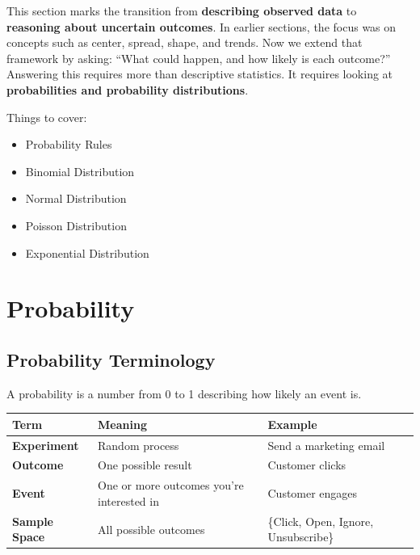 \documentclass[
  letterpaper,
  DIV=11,
  numbers=noendperiod]{scrreprt}
\newcounter{none} %
\providecommand{\tightlist}{%
  \setlength{\itemsep}{0pt}\setlength{\parskip}{0pt}}
\begin{document}
This section marks the transition from \textbf{describing observed data}
to \textbf{reasoning about uncertain outcomes}. In earlier sections, the
focus was on concepts such as center, spread, shape, and trends. Now we
extend that framework by asking: ``What could happen, and how likely is
each outcome?'' Answering this requires more than descriptive
statistics. It requires looking at \textbf{probabilities and probability
distributions}.

Things to cover:

\begin{itemize}
\tightlist
\item
  Probability Rules
\item
  Binomial Distribution
\item
  Normal Distribution
\item
  Poisson Distribution
\item
  Exponential Distribution
\end{itemize}

\section{Probability}\label{probability}

\subsection{Probability Terminology}\label{probability-terminology}

A probability is a number from 0 to 1 describing how likely an event is.

{\def\LTcaptype{none} %
\begin{longtable}[]{@{}
  >{\raggedright\arraybackslash}p{}
  >{\raggedright\arraybackslash}p{}
  >{\raggedright\arraybackslash}p{}@{}}
\toprule\noalign{}
\begin{minipage}[b]{\linewidth}\raggedright
Term
\end{minipage} & \begin{minipage}[b]{\linewidth}\raggedright
Meaning
\end{minipage} & \begin{minipage}[b]{\linewidth}\raggedright
Example
\end{minipage} \\
\midrule\noalign{}
\endhead
\bottomrule\noalign{}
\endlastfoot
\textbf{Experiment} & Random process & Send a marketing email \\
\textbf{Outcome} & One possible result & Customer clicks \\
\textbf{Event} & One or more outcomes you're interested in & Customer
engages \\
\textbf{Sample Space} & All possible outcomes & \{Click, Open, Ignore,
Unsubscribe\} \\
\end{longtable}
}
\end{document}
